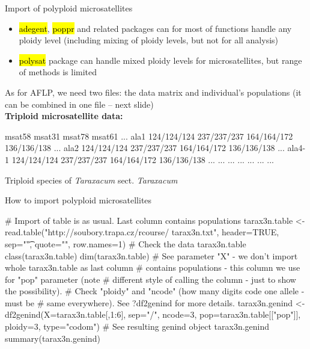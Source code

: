 \documentclass[compress, ucs, xelatex, 11pt, xcolor=svgnames,
  hyperref={
    bookmarks=true,
    unicode=true,
    colorlinks=true,
    pdftitle={Molecular data in R},
    plainpages=false,
    pdfauthor={Vojtech Zeisek},
    pdfsubject={Course about phylogeny and evolution in R},
    pdfcreator={XeLaTeX},
    pdfkeywords={R, evolution, phylogeny, molecular data},
    linkcolor=Tomato,
    anchorcolor=SaddleBrown,
    citecolor=Goldenrod,
    filecolor=DarkMagenta,
    menucolor=Sienna,
    urlcolor=DarkTurquoise,
    pdftex},
  url={hyphens, lowtilde} %
  ]{beamer}
\renewcommand{\texttt}[1]{\hl{\ttfamily #1}}
\begin{document}
\begin{frame}[fragile]{Import of polyploid microsatellites}
\begin{itemize}
 \item \texttt{adegent}, \texttt{poppr} and related packages can for most of functions handle any ploidy level (including mixing of ploidy levels, but not for all analysis)
 \item \texttt{polysat} package can handle mixed ploidy levels for microsatellites, but range of methods is limited
\end{itemize}
As for AFLP, we need two files: the data matrix and individual's populations (it can be combined in one file -- next slide)\\
\textbf{Triploid microsatellite data:}
  \begin{spluscode}
           msat58      msat31      msat78      msat61      ...
    ala1   124/124/124 237/237/237 164/164/172 136/136/138 ...
    ala2   124/124/124 237/237/237 164/164/172 136/136/138 ...
    ala4-1 124/124/124 237/237/237 164/164/172 136/136/138 ...
    ...    ...         ...         ...         ...         ...
  \end{spluscode}
  \begin{footnotesize}
    Triploid species of \textit{Taraxacum} sect. \textit{Taraxacum}
  \end{footnotesize}
\end{frame}

\begin{frame}[fragile]{How to import polyploid microsatellites}
  \begin{spluscode}
    # Import of table is as usual. Last column contains populations
    tarax3n.table <- read.table("http://soubory.trapa.cz/rcourse/
      tarax3n.txt", header=TRUE, sep="\t", quote="", row.names=1)
    # Check the data
    tarax3n.table
    class(tarax3n.table)
    dim(tarax3n.table)
    # See parameter "X" - we don't import whole tarax3n.table as last column
    # contains populations - this column we use for "pop" parameter (note
    # different style of calling the column - just to show the possibility).
    # Check "ploidy" and "ncode" (how many digits code one allele - must be
    # same everywhere). See ?df2genind for more details.
    tarax3n.genind <- df2genind(X=tarax3n.table[,1:6], sep="/", ncode=3,
      pop=tarax3n.table[["pop"]], ploidy=3, type="codom")
    # See resulting genind object
    tarax3n.genind
    summary(tarax3n.genind)
  \end{spluscode}
\end{frame}
\end{document}
